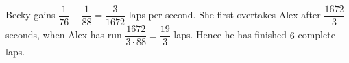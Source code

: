 Becky gains $\dfrac{1}{76}-\dfrac{1}{88}=\dfrac{3}{1672}$ laps per second. She first overtakes Alex after $\dfrac{1672}{3}$ seconds, when Alex has run $\dfrac{1672}{3\cdot88}=\dfrac{19}{3}$ laps. Hence he has finished $\boxed6$ complete laps.
